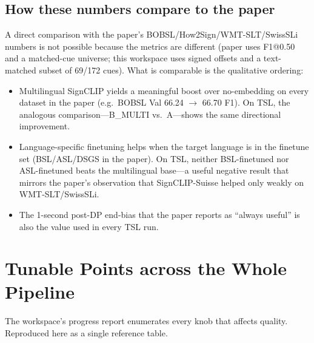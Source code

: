 \documentclass[11pt,a4paper]{article}
\def\emph#1{#1}%
\begin{document}
\subsection{How these numbers compare to the paper}
A direct comparison with the paper's BOBSL/How2Sign/WMT-SLT/SwissSLi numbers
is not possible because the metrics are different (paper uses F1@0.50 and a
matched-cue universe; this workspace uses signed offsets and a text-matched
subset of 69/172 cues). What \emph{is} comparable is the qualitative
ordering:
\begin{itemize}[leftmargin=1.5em]
  \item Multilingual SignCLIP yields a meaningful boost over no-embedding
        on every dataset in the paper (e.g.\ BOBSL Val 66.24 $\to$ 66.70 F1).
        On TSL, the analogous comparison---B\_MULTI vs.\ A---shows the same
        directional improvement.
  \item Language-specific finetuning helps when the target language is in
        the finetune set (BSL/ASL/DSGS in the paper). On TSL, neither
        BSL-finetuned nor ASL-finetuned beats the multilingual base---a
        useful negative result that mirrors the paper's observation that
        SignCLIP-Suisse helped only weakly on WMT-SLT/SwissSLi.
  \item The 1-second post-DP end-bias that the paper reports as
        ``always useful'' is also the value used in every TSL run.
\end{itemize}


\section{Tunable Points across the Whole Pipeline}

The workspace's progress report enumerates every knob that affects quality.
Reproduced here as a single reference table.
\end{document}

